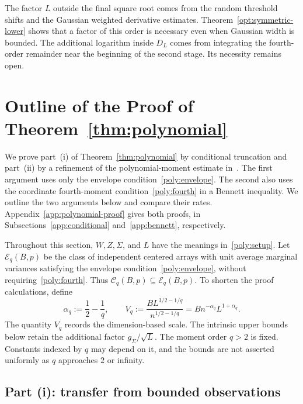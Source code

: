 \documentclass[11pt,letterpaper]{article}
\newenvironment{recovered}{}{}
\newcommand{\vSix}[1]{{\color{magenta}#1}}
\newenvironment{vSixBlock}{\color{magenta}}{}
\theoremstyle{remark}
\begin{document}
\begin{vSixBlock}
The factor \(L\) outside the final square root comes from the
random threshold shifts and the Gaussian weighted derivative estimates.
Theorem~\ref{opt:symmetric-lower} shows that a factor of this order
is necessary even when Gaussian width is bounded. The additional
logarithm inside \(D_L\) comes from integrating the fourth-order
remainder near the beginning of the second stage. Its necessity
remains open.
\end{vSixBlock}

\section{Outline of the Proof of Theorem~\ref*{thm:polynomial}}\label{sec:poly}

\begin{recovered}
We prove part~\textup{(i)} of Theorem~\ref{thm:polynomial} by
conditional truncation and part~\textup{(ii)} by a refinement of the
polynomial-moment estimate in~\cite{CCKK2022}. The first argument
uses only the envelope condition~\eqref{poly:envelope}. The second
also uses the coordinate fourth-moment condition~\eqref{poly:fourth}
in a Bennett inequality. We outline the two arguments below and
compare their rates. Appendix~\ref{app:polynomial-proof} gives
both proofs, in Subsections~\ref{app:conditional}
and~\ref{app:bennett}, respectively.
\end{recovered}

Throughout this section, \(W,Z,\Sigma\), and \(L\) have the meanings
in~\eqref{poly:setup}. Let \(\mathcal E_q(B,p)\) be the class of
independent centered arrays with unit average marginal variances
satisfying the envelope condition~\eqref{poly:envelope}, without
requiring~\eqref{poly:fourth}. Thus
\(\mathcal C_q(B,p)\subseteq\mathcal E_q(B,p)\).
To shorten the proof calculations, define
\begin{equation}
 \alpha_q:=\frac12-\frac1q,\qquad
 V_q:=\frac{B L^{3/2-1/q}}{n^{1/2-1/q}}
      =Bn^{-\alpha_q}L^{1+\alpha_q}.
 \label{poly:rates}
\end{equation}
\vSix{The quantity \(V_q\) records the dimension-based scale.
The intrinsic upper bounds below retain the additional factor
\(g_\Sigma/\sqrt L\).}
The moment order \(q>2\) is fixed. Constants indexed by \(q\)
may depend on it, and the bounds are not asserted uniformly as
\(q\) approaches \(2\) or infinity.

\subsection{\texorpdfstring{{Part (i): transfer from bounded observations}}{Part (i): transfer from bounded observations}}\label{poly:transfer-sec}
\end{document}
